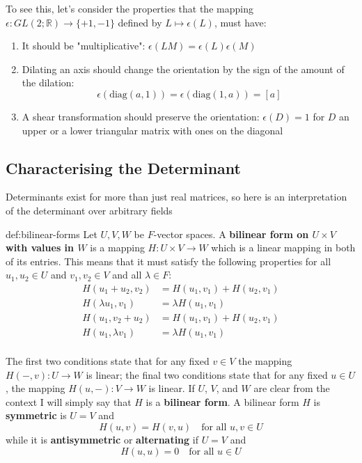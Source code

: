 \documentclass{article}
\begin{document}
\newpage
To see this, let's consider the properties that the mapping $\epsilon : GL(2;\mathbb{R})\to \{+1, -1\}$ defined by $L \mapsto \epsilon(L)$, must have:
\begin{enumerate}
    \item It should be "multiplicative": $\epsilon(LM) = \epsilon(L)\epsilon(M)$
    \item Dilating an axis should change the orientation by the sign of the amount of the dilation:
        \[\epsilon(\text{diag}(a, 1)) = \epsilon(\text{diag}(1, a)) = [a]\]
    \item A shear transformation should preserve the orientation: $\epsilon(D) = 1$ for $D$ an upper or a lower triangular matrix with ones on the diagonal
\end{enumerate}


\subsection{Characterising the Determinant}

Determinants exist for more than just real matrices, so here is an interpretation of the determinant over arbitrary fields

\begin{dfn}{def:bilinear-forms}{}
    Let $U,V,W$ be $F$-vector spaces. A \textbf{bilinear form on $U \times V$ with values in $W$} is a mapping $H: U \times V \to W $ which is a linear mapping in both of its entries. This means that it must satisfy the following properties for all $u_{1}, u_{2}\in U$ and $v_{1}, v_{2}\in V$ and all $\lambda\in F$:
    \begin{align*}
        H(u_{1} + u_{2}, v_{2}) &= H(u_{1}, v_{1}) + H(u_{2}, v_{1})\\
        H(\lambda u_{1}, v_{1}) &= \lambda H(u_{1}, v_{1}) \\
        H(u_{1}, v_{2} + u_{2}) &= H(u_{1}, v_{1}) + H(u_{2}, v_{1})\\
        H(u_{1},\lambda v_{1}) &= \lambda H(u_{1}, v_{1}) \\
    \end{align*}
\end{dfn}

The first two conditions state that for any fixed $v\in V$ the mapping $H(-, v) : U\to W$ is linear; the final two conditions state that for any fixed $u\in U$, the mapping $H(u, -) : V\to W$ is linear. If $U$, $V$, and $W$ are clear from the context I will simply say that $H$ is a \textbf{bilinear form}. A bilinear form $H$ is \textbf{symmetric} is $U = V$ and
\[H(u,v) = H(v,u)\quad \text{for all } u,v\in U\]
while it is \textbf{antisymmetric} or \textbf{alternating} if $U = V$ and
\[H(u, u) = 0 \quad\text{for all } u\in U\]
\end{document}
